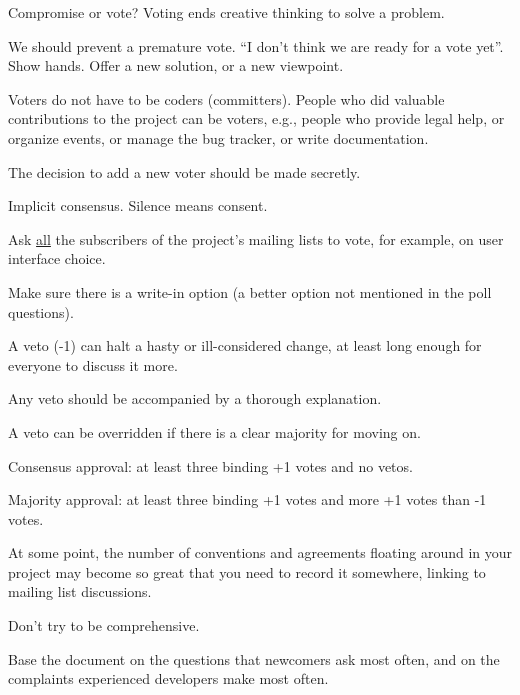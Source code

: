 \documentclass[landscape,30pt]{foils}
\begin{document}
Compromise or vote?  Voting ends creative thinking to solve a problem.

We should prevent a premature vote. ``I don't think we are ready for a vote yet''.  Show hands.  Offer a new solution, or a new viewpoint.

Voters do not have to be coders (committers).  People who did valuable contributions to the project can be voters, e.g., people who provide legal help, or organize events, or manage the bug tracker, or write documentation.

The decision to add a new voter should be made secretly.

Implicit consensus. Silence means consent.


Ask \underline{all} the subscribers of the project's mailing lists to vote, for example, on user interface choice.

Make sure there is a write-in option (a better option not mentioned in the poll questions). 


A veto (-1) can halt a hasty or ill-considered change, at least long enough for everyone to discuss it more.

Any veto should be accompanied by a thorough explanation.

A veto can be overridden if there is a clear majority for moving on.


Consensus approval: at least three binding +1 votes and no vetos.

Majority approval: at least three binding +1 votes and more +1 votes than -1 votes.


At some point, the number of conventions and agreements floating around in your project may become
so great that you need to record it somewhere, linking to mailing list discussions.

Don't try to be comprehensive.

Base the document on the questions that newcomers ask most often, and on the complaints experienced developers make most often.
\end{document}

